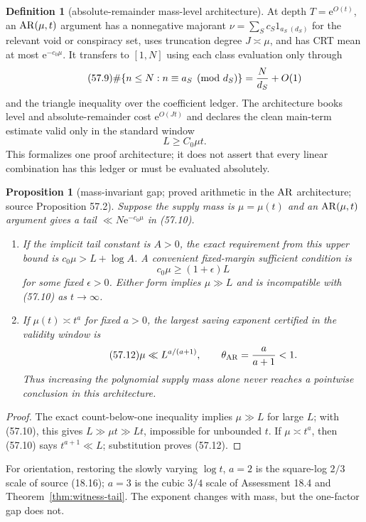 \documentclass[10pt,reqno]{amsart}
\newtheorem{proposition}[theorem]{Proposition}
\theoremstyle{definition}
\newtheorem{definition}[theorem]{Definition}
\newcommand{\e}{\mathrm e}
\newcommand{\1}{\mathbf 1}
\begin{document}
\begin{definition}[absolute-remainder mass-level architecture]
At depth $T=\e^{O(t)}$, an ${\rm AR}(\mu,t)$ argument has a nonnegative
majorant $\nu=\sum_Sc_S1_{a_S\ (d_S)}$ for the relevant void or conspiracy
set, uses truncation degree $J\asymp\mu$, and has CRT mean at most
$\e^{-c_0\mu}$.  It transfers to $[1,N]$ using each class evaluation only
through
\begin{equation}\tag{57.9}
 \#\{n\leq N:n\equiv a_S\pmod {d_S}\}={N\over d_S}+O(1)
\end{equation}
and the triangle inequality over the coefficient ledger.  The architecture
books level and absolute-remainder cost $\e^{O(Jt)}$ and declares the clean
main-term estimate valid only in the standard window
\begin{equation}\tag{57.10}
                              L\geq C_0\mu t.
\end{equation}
This formalizes one proof architecture; it does not assert that every linear
combination has this ledger or must be evaluated absolutely.
\end{definition}

\begin{proposition}[mass-invariant gap; proved arithmetic in the
${\rm AR}$ architecture; source Proposition 57.2]
\label{prop:mass-gap}
Suppose the supply mass is $\mu=\mu(t)$ and an ${\rm AR}(\mu,t)$ argument
gives a tail $\ll N\e^{-c_0\mu}$ in (57.10).
\begin{enumerate}[leftmargin=*,label=\arabic*.]
\item If the implicit tail constant is $A>0$, the exact requirement from
this upper bound is $c_0\mu>L+\log A$.  A convenient fixed-margin
\emph{sufficient} condition is
\begin{equation}\tag{57.11}
                        c_0\mu\geq(1+\epsilon)L
\end{equation}
for some fixed $\epsilon>0$.  Either form implies $\mu\gg L$ and is
incompatible with (57.10) as $t\to\infty$.
\item If $\mu(t)\asymp t^a$ for fixed $a>0$, the largest saving exponent
certified in the validity window is
\begin{equation}\tag{57.12}
 \mu\ll L^{a/(a+1)},\qquad \theta_{\rm AR}={a\over a+1}<1.
\end{equation}
Thus increasing the polynomial supply mass alone never reaches a pointwise
conclusion in this architecture.
\end{enumerate}
\end{proposition}
\begin{proof}
The exact count-below-one inequality implies $\mu\gg L$ for large $L$;
with (57.10), this gives $L\gg\mu t\gg Lt$, impossible for unbounded $t$.
If $\mu\asymp t^a$, then (57.10) says $t^{a+1}\ll L$; substitution proves
(57.12).
\end{proof}
For orientation, restoring the slowly varying $\log t$, $a=2$ is the
square-log $2/3$ scale of source (18.16); $a=3$ is the cubic $3/4$ scale of
Assessment 18.4 and Theorem~\ref{thm:witness-tail}.  The exponent changes
with mass, but the one-factor gap does not.
\end{document}
